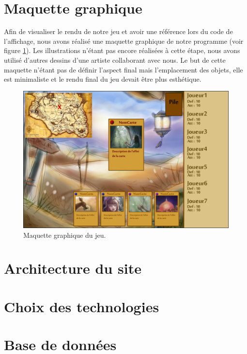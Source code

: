\documentclass[12pt]{report}
\begin{document}
    \section{Maquette graphique}
    
    Afin de visualiser le rendu de notre jeu et avoir une référence lors du code de l'affichage, nous avons réalisé une maquette graphique de notre programme (voir figure \ref{fig:maquette}). Les illustrations n'étant pas encore réalisées à cette étape, nous avons utilisé d'autres dessins d'une artiste collaborant avec nous. Le but de cette maquette n'étant pas de définir l'aspect final mais l'emplacement des objets, elle est minimaliste et le rendu final du jeu devait être plus esthétique.\\[1.5cm]
    
    \begin{figure}[h!]
    	\centering
	    \includegraphics[scale=2.8]{mock-up.png}
	    \caption{Maquette graphique du jeu.}
	    \label{fig:maquette}
    \end{figure}

    
    \section{Architecture du site}
    
    \section{Choix des technologies}
    
    \section{Base de données}
    
\end{document}
